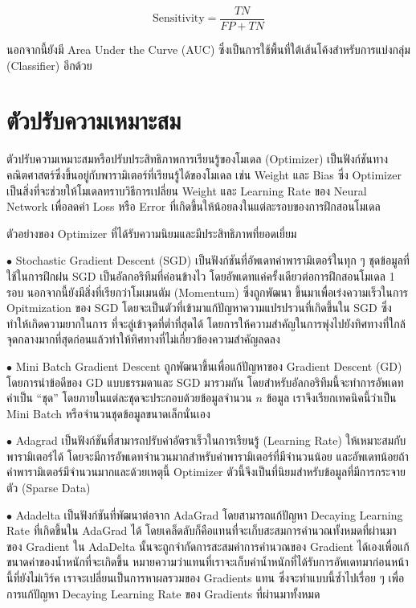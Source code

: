 \begin{equation}
    \text{Sensitivity} = \frac{TN}{FP+TN}
\end{equation}

\noindent นอกจากนี้ยังมี Area Under the Curve (AUC) ซึ่งเป็นการใช้พื้นที่ใต้เส้นโค้งสำหรับการแบ่งกลุ่ม (Classifier) อีกด้วย

\section{ตัวปรับความเหมาะสม}
\label{sec:optimizer}

ตัวปรับความเหมาะสมหรือปรับประสิทธิภาพการเรียนรู้ของโมเดล (Optimizer) เป็นฟังก์ชันทางคณิตศาสตร์ซึ่งขึ้นอยู่กับพารามิเตอร์ที่เรียนรู้ได้ของโมเดล 
เช่น Weight และ Bias ซึ่ง Optimizer เป็นสิ่งที่จะช่วยให้โมเดลทราบวิธีการเปลี่ยน Weight และ Learning Rate ของ Neural Network 
เพื่อลดค่า Loss หรือ Error ที่เกิดขึ้นให้น้อยลงในแต่ละรอบของการฝึกสอนโมเดล

ตัวอย่างของ Optimizer ที่ได้รับความนิยมและมีประสิทธิภาพที่ยอดเยี่ยม

\noindent $\bullet$ Stochastic Gradient Descent (SGD) เป็นฟังก์ชันที่อัพเดทค่าพารามิเตอร์ในทุก ๆ ชุดข้อมูลที่ใช้ในการฝึกฝน SGD 
เป็นอัลกอริทึมที่ค่อนข้างไว โดยอัพเดทแค่ครั้งเดียวต่อการฝึกสอนโมเดล 1 รอบ นอกจากนี้ยังมีสิ่งที่เรียกว่าโมเมนตัม (Momentum) ซึ่งถูกพัฒนา%
ขึ้นมาเพื่อเร่งความเร็วในการ Opitmization ของ SGD โดยจะเป็นตัวที่เข้ามาแก้ปัญหาความแปรปรวนที่เกิดขึ้นใน SGD ซึ่งทำให้เกิดความยากในการ%
ที่จะลู่เข้าจุดที่ต่ำที่สุดได้ โดยการให้ความสำคัญในการพุ่งไปยังทิศทางที่ใกล้จุดกลางมากที่สุดก่อนแล้วทำให้ทิศทางที่ไม่เกี่ยวข้องความสำคัญลดลง

\noindent $\bullet$ Mini Batch Gradient Descent ถูกพัฒนาขึ้นเพื่อแก้ปัญหาของ Gradient Descent (GD) โดยการนำข้อดีของ GD 
แบบธรรมดาและ SGD มารวมกัน โดยสำหรับอัลกอริทึมนี้จะทำการอัพเดทค่าเป็น \enquote{ชุด} โดยภายในแต่ละชุดจะประกอบด้วยข้อมูลจำนวน 
$n$ ข้อมูล เราจึงเรียกเทคนิคนี้ว่าเป็น Mini Batch หรือจำนวนชุดข้อมูลขนาดเล็กนั่นเอง

\noindent $\bullet$ Adagrad เป็นฟังก์ชันที่สามารถปรับค่าอัตราเร็วในการเรียนรู้ (Learning Rate) ให้เหมาะสมกับพารามิเตอร์ได้ 
โดยจะมีการอัพเดทจำนวนมากสำหรับค่าพารามิเตอร์ที่มีจำนวนน้อย และอัพเดทน้อยถ้าค่าพารามิเตอร์มีจำนวนมากและด้วยเหตุนี้ Optimizer 
ตัวนี้จึงเป็นที่นิยมสำหรับข้อมูลที่มีการกระจายตัว (Sparse Data)

\noindent $\bullet$ Adadelta เป็นฟังก์ชันที่พัฒนาต่อจาก AdaGrad โดยสามารถแก้ปัญหา Decaying Learning Rate ที่เกิดขึ้นใน 
AdaGrad ได้ โดยเคล็ดลับก็คือแทนที่จะเก็บสะสมการคำนวณทั้งหมดที่ผ่านมาของ Gradient ใน AdaDelta นั้นจะถูกจำกัดการสะสมค่าการคำนวณของ 
Gradient ได้เองเพื่อแก้ขนาดค่าของน้ำหนักที่จะเกิดขึ้น หมายความว่าแทนที่เราจะเก็บค่าน้ำหนักที่ได้รับการอัพเดทมาก่อนหน้านี้ที่ยังไม่เวิร์ค 
เราจะเปลี่ยนเป็นการหาผลรวมของ Gradients แทน ซึ่งจะทำแบบนี้ซ้ำไปเรื่อย ๆ เพื่อการแก้ปัญหา Decaying Learning Rate ของ Gradients 
ที่ผ่านมาทั้งหมด

